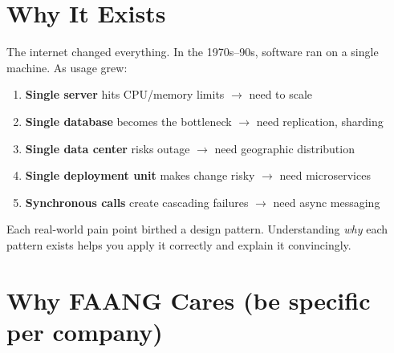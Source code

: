 \documentclass[11pt]{article}
\providecommand{\tightlist}{\setlength{\itemsep}{1pt}\setlength{\parskip}{0pt}}
\begin{document}
\section{Why It Exists}\label{why-it-exists}

The internet changed everything. In the 1970s--90s, software ran on a single machine. As usage grew:

\begin{enumerate}
\def\labelenumi{\arabic{enumi}.}
\tightlist
\item
  \textbf{Single server} hits CPU/memory limits \(\rightarrow\) need to scale
\item
  \textbf{Single database} becomes the bottleneck \(\rightarrow\) need replication, sharding
\item
  \textbf{Single data center} risks outage \(\rightarrow\) need geographic distribution
\item
  \textbf{Single deployment unit} makes change risky \(\rightarrow\) need microservices
\item
  \textbf{Synchronous calls} create cascading failures \(\rightarrow\) need async messaging
\end{enumerate}

Each real-world pain point birthed a design pattern. Understanding \emph{why} each pattern exists helps you apply it correctly and explain it convincingly.

\section{Why FAANG Cares (be specific per company)}\label{why-faang-cares-be-specific-per-company}
\end{document}
